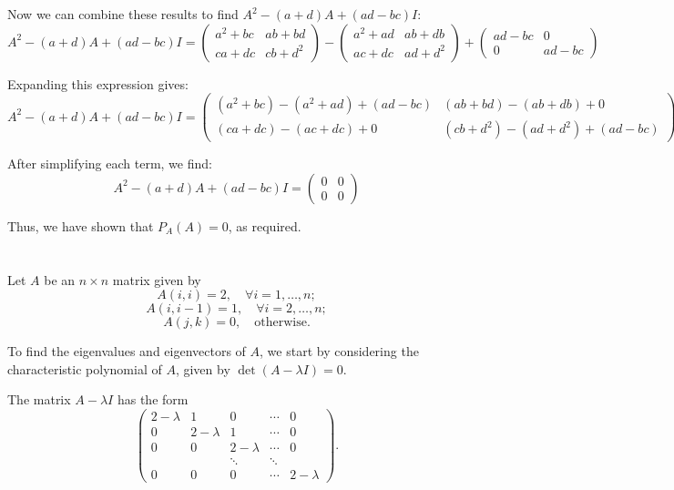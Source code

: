 \documentclass{article}
\begin{document}
Now we can combine these results to find \( A^2 - (a + d)A + (ad - bc)I \):
\[
    A^2 - (a + d)A + (ad - bc)I = \begin{pmatrix} a^2 + bc & ab + bd \\ ca + dc & cb + d^2 \end{pmatrix} - \begin{pmatrix} a^2 + ad & ab + db \\ ac + dc & ad + d^2 \end{pmatrix} + \begin{pmatrix} ad - bc & 0 \\ 0 & ad - bc \end{pmatrix}
\]

Expanding this expression gives:
\[
    A^2 - (a + d)A + (ad - bc)I = \begin{pmatrix} (a^2 + bc) - (a^2 + ad) + (ad - bc) & (ab + bd) - (ab + db) + 0 \\ (ca + dc) - (ac + dc) + 0 & (cb + d^2) - (ad + d^2) + (ad - bc) \end{pmatrix}
\]

After simplifying each term, we find:
\[
    A^2 - (a + d)A + (ad - bc)I = \begin{pmatrix} 0 & 0 \\ 0 & 0 \end{pmatrix}
\]

Thus, we have shown that \( P_A(A) = 0 \), as required.

\section    {}

Let \( A \) be an \( n \times n \) matrix given by
\[
    A(i, i) = 2, \quad \forall i = 1, \dots, n;
\]
\[
    A(i, i - 1) = 1, \quad \forall i = 2, \dots, n;
\]
\[
    A(j, k) = 0, \quad \text{otherwise}.
\]

To find the eigenvalues and eigenvectors of \( A \), we start by considering the characteristic polynomial of \( A \), given by \( \det(A - \lambda I) = 0 \).

The matrix \( A - \lambda I \) has the form
\[
    \begin{pmatrix}
        2 - \lambda & 1           & 0           & \cdots & 0           \\
        0           & 2 - \lambda & 1           & \cdots & 0           \\
        0           & 0           & 2 - \lambda & \cdots & 0           \\
                    &             & \ddots      & \ddots &             \\
        0           & 0           & 0           & \cdots & 2 - \lambda
    \end{pmatrix}.
\]
\end{document}
